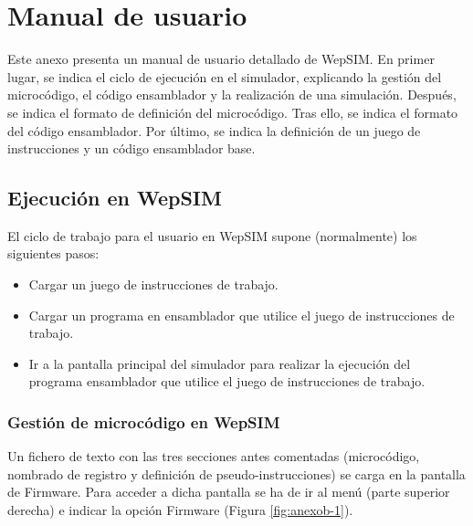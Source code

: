 \chead[]{}
\renewcommand{\headrulewidth}{0.5pt}

\lfoot[]{}
\cfoot[]{}
\rfoot[]{}
\renewcommand{\footrulewidth}{0pt}




\chapter{Manual de usuario}

Este anexo presenta un manual de usuario detallado de WepSIM. En primer lugar, se indica el ciclo de ejecución en el simulador, explicando la gestión del microcódigo, el código ensamblador y la realización de una simulación. Después, se indica el formato de definición del microcódigo. Tras ello, se indica el formato del código ensamblador. Por último, se indica la definición de un juego de instrucciones y un código ensamblador base.

\section*{Ejecución en WepSIM}

El ciclo de trabajo para el usuario en WepSIM supone (normalmente) los siguientes pasos:

\begin{itemize}

\item Cargar un juego de instrucciones de trabajo.

\item Cargar un programa en ensamblador que utilice el juego de instrucciones de trabajo.

\item Ir a la pantalla principal del simulador para realizar la ejecución del programa ensamblador que utilice el juego de instrucciones de trabajo.

\end{itemize}

\subsection*{Gestión de microcódigo en WepSIM}
\label{ch:anexob_microcodigo}

Un fichero de texto con las tres secciones antes comentadas (microcódigo, nombrado de registro y definición de pseudo-instrucciones) se carga en la pantalla de Firmware. Para acceder a dicha pantalla se ha de ir al menú (parte superior derecha) e indicar la opción Firmware (Figura \ref{fig:anexob-1}).

